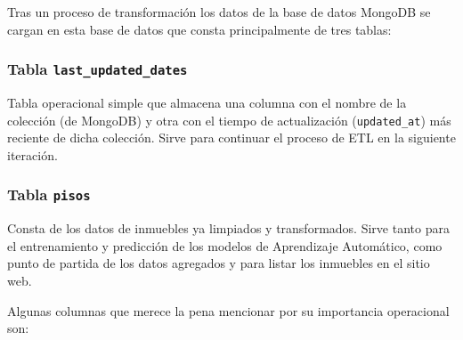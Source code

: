 Tras un proceso de transformación los datos de la base de datos MongoDB se cargan en esta base de datos que consta principalmente de tres tablas:

\subsubsection{Tabla \texttt{last\_updated\_dates}}

Tabla operacional simple que almacena una columna con el nombre de la colección (de MongoDB) y otra con el tiempo de actualización (\texttt{updated\_at}) más reciente de dicha colección. Sirve para continuar el proceso de ETL en la siguiente iteración.

\subsubsection{Tabla \texttt{pisos}}{\label{subsec:tabla_pisos}}

Consta de los datos de inmuebles ya limpiados y transformados. Sirve tanto para el entrenamiento y predicción de los modelos de Aprendizaje Automático, como punto de partida de los datos agregados y para listar los inmuebles en el sitio web. 

Algunas columnas que merece la pena mencionar por su importancia operacional son: 

